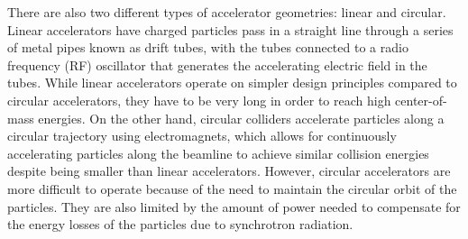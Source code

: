 There are also two different types of accelerator geometries: linear and circular.
Linear accelerators have charged particles pass in a straight line through a series of metal pipes known as drift tubes, with the tubes connected to a radio frequency (RF) oscillator that generates the accelerating electric field in the tubes. %
While linear accelerators operate on simpler design principles compared to circular accelerators, they have to be very long in order to reach high center-of-mass energies.
On the other hand, circular colliders accelerate particles along a circular trajectory using electromagnets, which allows for continuously accelerating particles along the beamline to achieve similar collision energies despite being smaller than linear accelerators. %
However, circular accelerators are more difficult to operate because of the need to maintain the circular orbit of the particles.
They are also limited by the amount of power needed to compensate for the energy losses of the particles due to synchrotron radiation.

